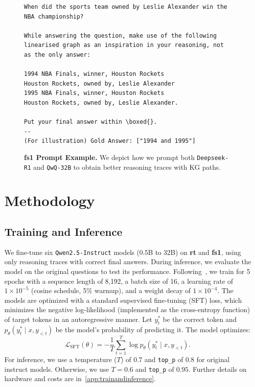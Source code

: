 \documentclass[11pt]{article}
\newcommand{\rone}{\texttt{Deepseek-R1}}
\newcommand{\qwq}{\texttt{QwQ-32B}}
\newcommand{\dataset}{\textbf{fs1}}
\newcommand{\datasetrt}{\textbf{\textbf{rt}}}
\begin{document}
\begin{figure}[t!]
    \centering
        \begin{tcolorbox}[title=fs1 Prompt Example, promptstyle, width=\linewidth] 
        \lstset{
            basicstyle=\tiny\sffamily\tiny,
            breaklines=true,
            frame=none,
            columns=fullflexible,
        }
        \begin{lstlisting}
When did the sports team owned by Leslie Alexander win the NBA championship?

While answering the question, make use of the following linearised graph as an inspiration in your reasoning, not as the only answer:

1994 NBA Finals, winner, Houston Rockets
Houston Rockets, owned by, Leslie Alexander
1995 NBA Finals, winner, Houston Rockets
Houston Rockets, owned by, Leslie Alexander.

Put your final answer within \boxed{}.
--
(For illustration) Gold Answer: ["1994 and 1995"]
        \end{lstlisting}
        \end{tcolorbox}
        \caption{\textbf{fs1 Prompt Example.} We depict how we prompt both \rone{} and \qwq{} to obtain better reasoning traces with KG paths.}
        \label{fig:fs1}
\end{figure}

\section{Methodology}\label{methodology}

\subsection{Training and Inference}
We fine-tune six \texttt{Qwen2.5-Instruct} models (0.5B to 32B) on \datasetrt{} and \dataset{}, using only reasoning traces with correct final answers. During inference, we evaluate the model on the original questions to test its performance. Following~\citet{muennighoff2025s1simpletesttimescaling}, we train for 5 epochs with a sequence length of 8,192, a batch size of 16, a learning rate of $1 \times 10^{-5}$ (cosine schedule, 5\% warmup), and a weight decay of $1 \times 10^{-4}$. The models are optimized with a standard supervised fine-tuning (SFT) loss, which minimizes the negative log-likelihood (implemented as the cross-entropy function) of target tokens in an autoregressive manner. Let $y_t^*$ be the correct token and $p_\theta(y_t^* \mid x, y_{<t})$ be the model's probability of predicting it. The model optimizes:
\begin{equation}
\mathcal{L}_\text{SFT}(\theta)=-\frac{1}{T} \sum_{t=1}^T \log p_\theta\left(y_t^* \mid x, y_{<t}\right).
\end{equation}
For inference, we use a temperature ($T$) of $0.7$ and \verb|top_p| of $0.8$ for original instruct models. Otherwise, we use $T = 0.6$ and \verb|top_p| of $0.95$. 
Further details on hardware and costs are in~\cref{app:trainandinference}.
\end{document}
